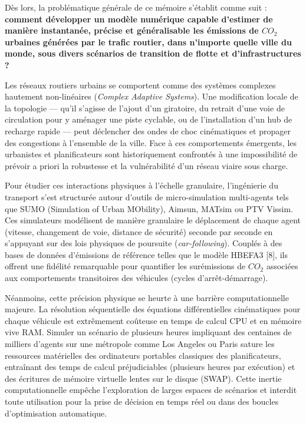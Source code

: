 \documentclass[10pt, a4paper]{article}
\begin{document}
Dès lors, la problématique générale de ce mémoire s'établit comme suit :
\textbf{comment développer un modèle numérique capable d'estimer de
manière instantanée, précise et généralisable les émissions de \(CO_2\)
urbaines générées par le trafic routier, dans n'importe quelle ville du
monde, sous divers scénarios de transition de flotte et
d'infrastructures ?}

Les réseaux routiers urbains se comportent comme des systèmes complexes
hautement non-linéaires (\emph{Complex Adaptive Systems}). Une
modification locale de la topologie --- qu'il s'agisse de l'ajout d'un
giratoire, du retrait d'une voie de circulation pour y aménager une
piste cyclable, ou de l'installation d'un hub de recharge rapide ---
peut déclencher des ondes de choc cinématiques et propager des
congestions à l'ensemble de la ville. Face à ces comportements
émergents, les urbanistes et planificateurs sont historiquement
confrontés à une impossibilité de prévoir a priori la robustesse et la
vulnérabilité d'un réseau viaire sous charge.

Pour étudier ces interactions physiques à l'échelle granulaire,
l'ingénierie du transport s'est structurée autour d'outils de
micro-simulation multi-agents tels que SUMO (Simulation of Urban
MObility), Aimsun, MATsim ou PTV Vissim. Ces simulateurs modélisent de
manière granulaire le déplacement de chaque agent (vitesse, changement
de voie, distance de sécurité) seconde par seconde en s'appuyant sur des
lois physiques de poursuite (\emph{car-following}). Couplés à des bases
de données d'émissions de référence telles que le modèle HBEFA3 {[}8{]},
ils offrent une fidélité remarquable pour quantifier les surémissions de
\(CO_2\) associées aux comportements transitoires des véhicules (cycles
d'arrêt-démarrage).

Néanmoins, cette précision physique se heurte à une barrière
computationnelle majeure. La résolution séquentielle des équations
différentielles cinématiques pour chaque véhicule est extrêmement
coûteuse en temps de calcul CPU et en mémoire vive RAM. Simuler un
scénario de plusieurs heures impliquant des centaines de milliers
d'agents sur une métropole comme Los Angeles ou Paris sature les
ressources matérielles des ordinateurs portables classiques des
planificateurs, entraînant des temps de calcul préjudiciables (plusieurs
heures par exécution) et des écritures de mémoire virtuelle lentes sur
le disque (SWAP). Cette inertie computationnelle empêche l'exploration
de larges espaces de scénarios et interdit toute utilisation pour la
prise de décision en temps réel ou dans des boucles d'optimisation
automatique.
\end{document}

